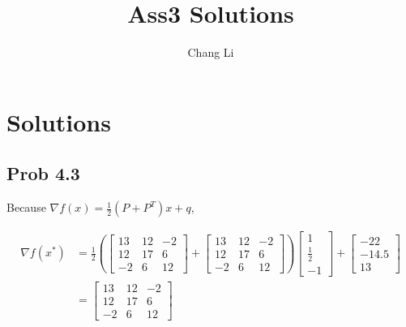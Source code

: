 \documentclass[10pt,a4paper]{article}
\begin{document}
\title{Ass3 Solutions}
\author{Chang Li}
\maketitle

\section{Solutions}

\subsection{Prob 4.3}
Because $\nabla f(x) = \frac{1}{2}(P+P^T)x + q$,

\begin{align*}
  \nabla f(x^*) &=\frac{1}{2}(
                  \begin{bmatrix}
                    13 & 12 & -2\\
                    12 & 17 & 6\\
                    -2 & 6 & 12
                  \end{bmatrix}
                             +
                             \begin{bmatrix}
                               13 & 12 & -2\\
                               12 & 17 & 6\\
                               -2 & 6 & 12
                             \end{bmatrix})
                                        \begin{bmatrix}
                                          1\\
                                          \frac{1}{2}\\
                                          -1
                                        \end{bmatrix} +
  \begin{bmatrix}
    -22\\
    -14.5\\
    13
  \end{bmatrix}\\
                &=
                  \begin{bmatrix}
                    13 & 12 & -2\\
                    12 & 17 & 6\\
                    -2 & 6 & 12
                  \end{bmatrix}

\end{align*}
\end{document}
